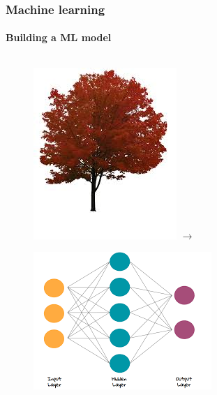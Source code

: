 \documentclass[aspectratio=43]{beamer}
\begin{document}
\begin{frame}

	\frametitle{Machine learning}
	\framesubtitle{Building a ML model}
	
	\begin{figure}

		\begin{columns}
			\includegraphics[width = \linewidth]{plots/tree2.jpeg}
			$\longrightarrow$
		\end{columns}
		\endminipage
		\hspace*{-1.25cm}	
		\includegraphics[width = 1.25\linewidth]{plots/NN.png}

\end{figure}
\end{frame}
\end{document}

